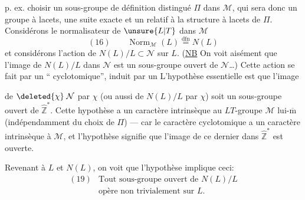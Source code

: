 
p. ex. choisir un sous-groupe de définition distingué $\Pi$ dans $\mathcal{M}$, qui sera donc un groupe à lacets,  une suite exacte
et un 
relatif à la structure à lacets de $\Pi$. Considérons le normalisateur de $\unsure{L|T}$ dans $\mathcal{M}$
\[
(16)\qquad \operatorname{Norm}_{\mathcal{M}}(L)\overset{\mathrm{dfn}}{=}N(L)
\]
et considérons l'action de $N(L)/L\subset\mathcal{N}$  sur $L$. (\uline{NB} On voit aisément que l'image de $N(L)/L$ dans $\mathcal{N}$ est un sous-groupe ouvert de $\mathcal{N}$\ldots) Cette action se fait par un `` cyclotomique'', induit par un 
L'hypothèse essentielle est que l'image


de $\deleted{\chi}\;\mathcal{N}$ par $\chi$ (ou aussi de $N(L)/L$ par $\chi$) soit un sous-groupe ouvert de $\widehat{\mathbb{Z}}^{*}$. Cette hypothèse a un caractère intrinsèque au $LT$-groupe $\mathcal{M}$ lui-$\overline{\mathrm m}$ (indépendamment du choix de $\Pi$) --- car le caractère cyclotomique
a un caractère intrinsèque à $\mathcal{M}$, et l'hypothèse signifie que l'image de ce dernier dans $\widehat{\mathbb{Z}}^{*}$ est ouverte.

Revenant à $L$ et $N(L)$, on voit que l'hypothèse  implique ceci:
\[
\begin{array}{ll}
(19)&\text{Tout sous-groupe ouvert de }N(L)/L\\
&\text{opère non trivialement sur }L.
\end{array}
\]

